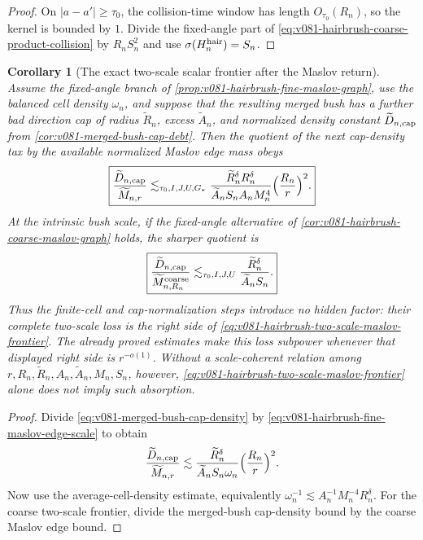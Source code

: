 \documentclass[10pt]{article}
\newtheorem{corollary}[theorem]{Corollary}
\begin{document}
\begin{proof}
On \(|a-a'|\ge\tau_0\), the collision-time window has length
\(O_{\tau_0}(R_n)\), so the kernel is bounded by \(1\).  Divide the fixed-angle part of
\eqref{eq:v081-hairbrush-coarse-product-collision} by
\(R_nS_n^2\) and use
\(\sigma(H_n^{\rm hair})=S_n\).
\end{proof}

\begin{corollary}[The exact two-scale scalar frontier after the Maslov return]
\label{cor:v081-hairbrush-two-scale-maslov-frontier}
Assume the fixed-angle branch of
\cref{prop:v081-hairbrush-fine-maslov-graph}, use the balanced cell density
\(\omega_n\), and suppose that the resulting merged bush has a further bad direction cap of radius
\(\widetilde R_n\), excess \(\widetilde A_n\), and normalized density constant
\(\widetilde D_{n,\rm cap}\) from
\cref{cor:v081-merged-bush-cap-debt}.  Then the quotient of the next cap-density tax by the
available normalized Maslov edge mass obeys
\begin{equation}
\label{eq:v081-hairbrush-two-scale-maslov-frontier}
\boxed{
\frac{\widetilde D_{n,\rm cap}}{\widetilde M_{n,r}}
\lesssim_{\tau_0,I,J,U,G_*}
\frac{\widetilde R_n^\delta R_n^\delta}
{\widetilde A_nS_nA_nM_n^4}
\Bigl(\frac{R_n}{r}\Bigr)^2.
}
\end{equation}
At the intrinsic bush scale, if the fixed-angle alternative of
\cref{cor:v081-hairbrush-coarse-maslov-graph} holds, the sharper quotient is
\begin{equation}
\label{eq:v081-hairbrush-coarse-two-scale-frontier}
\boxed{
\frac{\widetilde D_{n,\rm cap}}
{\widetilde M^{\rm coarse}_{n,R_n}}
\lesssim_{\tau_0,I,J,U}
\frac{\widetilde R_n^\delta}{\widetilde A_nS_n}.
}
\end{equation}
Thus the finite-cell and cap-normalization steps introduce no hidden factor: their complete
two-scale loss is the right side of
\eqref{eq:v081-hairbrush-two-scale-maslov-frontier}.  The already proved estimates make this
loss subpower whenever that displayed right side is \(r^{-o(1)}\).  Without a scale-coherent
relation among \(r,R_n,\widetilde R_n,A_n,\widetilde A_n,M_n,S_n\), however,
\eqref{eq:v081-hairbrush-two-scale-maslov-frontier} alone does not imply such absorption.
\end{corollary}

\begin{proof}
Divide \eqref{eq:v081-merged-bush-cap-density} by
\eqref{eq:v081-hairbrush-fine-maslov-edge-scale} to obtain
\[
\frac{\widetilde D_{n,\rm cap}}{\widetilde M_{n,r}}
\lesssim
\frac{\widetilde R_n^\delta}{\widetilde A_nS_n\omega_n}
\Bigl(\frac{R_n}{r}\Bigr)^2.
\]
Now use the average-cell-density estimate, equivalently
\(\omega_n^{-1}\lesssim A_n^{-1}M_n^{-4}R_n^\delta\).
For the coarse two-scale frontier, divide the merged-bush cap-density bound by the coarse Maslov
edge bound.
\end{proof}
\end{document}
